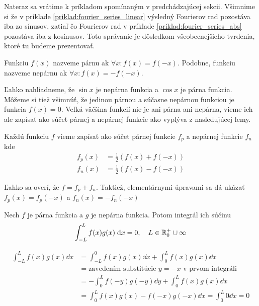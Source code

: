 Nateraz sa vrátime k príkladom spomínaným v predchádzajúcej sekcii.
Všimnime si že v príklade \ref{priklad:fourier_series_linear} 
výsledný Fourierov rad pozostáva iba zo sínusov, zatiaľ čo Fourierov
rad v príklade
\ref{priklad:fourier_series_abs} pozostáva iba z kosínusov. Toto
správanie je dôsledkom všeobecnejšieho tvrdenia, ktoré tu budeme
prezentovať.
\begin{definicia}
    Funkciu $f(x)$ nazveme párnu ak
    $\forall x: f(x) = f(-x)$. Podobne, funkciu nazveme nepárnu ak
    $\forall x: f(x) = - f(-x)$.
\end{definicia}
Ľahko nahliadneme, že $\sin x$ je nepárna funkcia a $\cos x$ je párna
funkcia. Môžeme si tiež všimnúť, že jedinou párnou a súčasne nepárnou
funkciou je funkcia $f(x)=0$.
Veľká väčšina funkcií nie je ani párna ani nepárna, vieme ich ale
zapísať ako súčet párnej a nepárnej funkcie ako vyplýva z nasledujúcej
lemy.
\begin{lema}
    Každú funkciu $f$ vieme zapísať ako súčet párnej funkcie $f_p$
    a nepárnej funkcie $f_n$ kde
    \begin{align*}
        f_p(x) &= \frac{1}{2} (f(x) + f(-x)) \\
        f_n(x) &= \frac{1}{2} (f(x) - f(-x))
    \end{align*}
\end{lema}
\begin{dokaz}
    Ľahko sa overí, že $f = f_p + f_n$. Taktiež, elementárnymi
    úpravami sa dá ukázať $f_p(x) = f_p(-x)$ a $f_n(x) = - f_n(-x)$
\end{dokaz}

\begin{veta}
    Nech $f$ je párna funkcia a $g$ je nepárna funkcia. Potom integrál
    ich súčinu
    \begin{equation*}
        \int_{-L}^{L} f(x) g(x) \; \mathrm{d} x = 0, \quad L \in {\mathbb R}_0^+ \cup
        \infty
    \end{equation*}
    \label{veta:int_parna_neparna}
\end{veta}
\begin{dokaz}
    \begin{equation*}
    \begin{split}
      \int_{-L}^{L} f(x) g(x) \dd x &= 
                \int_{-L}^0 f(x) g(x) \dd x +
                \int_0^L f(x) g(x) \dd x \\
            &= \text{zavedením substitúcie $y=-x$ v prvom integráli}
            \\
            &= - \int_{0}^{L} f(-y) g(-y) \dd y + 
                \int_0^L f(x) g(x) \dd x \\
            &= \int_0^L f(x) g(x) - f(-x) g(-x) \dd x 
             = \int_0^L 0 \dd x= 0
    \end{split}
    \end{equation*}
\end{dokaz}

